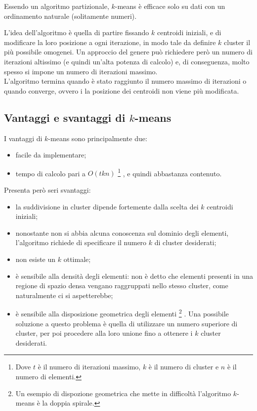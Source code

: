 Essendo un algoritmo partizionale, $k$-means è efficace solo su dati con un
ordinamento naturale (solitamente numeri).

L'idea dell'algoritmo è quella di partire fissando $k$ centroidi iniziali, e di
modificare la loro posizione a ogni iterazione, in modo tale da definire $k$
cluster il più possibile omogenei.
Un approccio del genere può richiedere però un numero di iterazioni altissimo
(e quindi un'alta potenza di calcolo) e, di conseguenza, molto spesso si impone
un numero di iterazioni massimo.\\
L'algoritmo termina quando è stato raggiunto il numero massimo di iterazioni o
quando converge, ovvero i la posizione dei centroidi non viene più modificata.

\subsection{Vantaggi e svantaggi di $k$-means}
I vantaggi di $k$-means sono principalmente due:
\begin{itemize}
    \item facile da implementare;
    \item tempo di calcolo pari a $O(tkn)$ 
            \footnote{Dove $t$ è il numero di iterazioni massimo, $k$ è il
            numero di cluster e $n$ è il numero di elementi.}
    , e quindi abbastanza contenuto. 
\end{itemize}
Presenta però seri svantaggi:
\begin{itemize}
    \item la suddivisione in cluster dipende fortemente dalla scelta dei $k$
    centroidi iniziali;
    \item nonostante non si abbia alcuna conoscenza sul dominio degli elementi,
    l'algoritmo richiede di specificare il numero $k$ di cluster desiderati;
    \item non esiste un $k$ ottimale;
    \item è sensibile alla densità degli elementi: non è detto che elementi
    presenti in una regione di spazio densa vengano raggruppati nello stesso
    cluster, come naturalmente ci si aspetterebbe;
    \item è sensibile alla disposizione geometrica degli elementi 
            \footnote{Un esempio di dispozione geometrica che mette in
            difficoltà l'algoritmo $k$-means è la doppia spirale.}
    . Una possibile soluzione a questo problema è quella di utilizzare un numero
    superiore di cluster, per poi procedere alla loro unione fino a ottenere i
    $k$ cluster desiderati.
\end{itemize}

